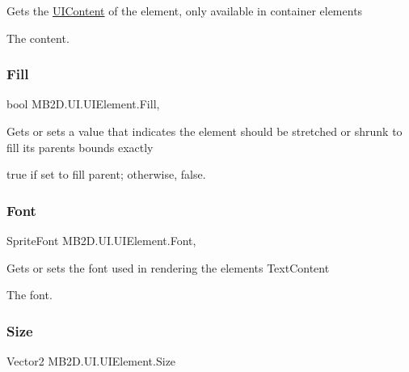 Gets the \hyperlink{class_m_b2_d_1_1_u_i_1_1_u_i_content}{U\+I\+Content} of the element, only available in container elements 

The content.\hypertarget{class_m_b2_d_1_1_u_i_1_1_u_i_element_a4bd0871f3e17f95b35aef3f3292bd89e}{}\label{class_m_b2_d_1_1_u_i_1_1_u_i_element_a4bd0871f3e17f95b35aef3f3292bd89e} 
\subsubsection{\texorpdfstring{Fill}{Fill}}
{\footnotesize\ttfamily bool M\+B2\+D.\+U\+I.\+U\+I\+Element.\+Fill\hspace{0.3cm}{\ttfamily [get]}, {\ttfamily [set]}}



Gets or sets a value that indicates the element should be stretched or shrunk to fill its parents bounds exactly 

{\ttfamily true} if set to fill parent; otherwise, {\ttfamily false}.\hypertarget{class_m_b2_d_1_1_u_i_1_1_u_i_element_a4c6bdbe83ece72ab6434c439371a0a39}{}\label{class_m_b2_d_1_1_u_i_1_1_u_i_element_a4c6bdbe83ece72ab6434c439371a0a39} 
\subsubsection{\texorpdfstring{Font}{Font}}
{\footnotesize\ttfamily Sprite\+Font M\+B2\+D.\+U\+I.\+U\+I\+Element.\+Font\hspace{0.3cm}{\ttfamily [get]}, {\ttfamily [set]}}



Gets or sets the font used in rendering the elements Text\+Content 

The font.\hypertarget{class_m_b2_d_1_1_u_i_1_1_u_i_element_a0de3ac5ae7a1377b62677a9aeae8955e}{}\label{class_m_b2_d_1_1_u_i_1_1_u_i_element_a0de3ac5ae7a1377b62677a9aeae8955e} 
\subsubsection{\texorpdfstring{Size}{Size}}
{\footnotesize\ttfamily Vector2 M\+B2\+D.\+U\+I.\+U\+I\+Element.\+Size\hspace{0.3cm}{\ttfamily [get]}}



